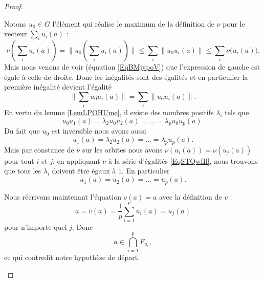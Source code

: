 \begin{proof}
\begin{subproof}
        Notons \( u_0\in G\) l'élément qui réalise le maximum de la définition de \( \nu\) pour le vecteur \( \sum_iu_i(a)\) :
        \begin{equation}
            \nu\left( \sum_i u_i(a) \right)=\| u_0\left( \sum_iu_i(a) \right) \|\leq\sum_i\| u_0u_i(a) \|\leq \sum_i\nu\big( u_i(a) \big).
        \end{equation}
        Mais nous venons de voir (équation \eqref{EqBMjypoV}) que l'expression de gauche est égale à celle de droite. Donc les inégalités sont des égalités et en particulier la première inégalité devient l'égalité
        \begin{equation}
            \| \sum_iu_0u_i(a)  \|=\sum_i\| u_0u_i(a) \|.
        \end{equation}
        En vertu du lemme \ref{LemLPOHUme}, il existe des nombres positifs \( \lambda_i\) tels que
        \begin{equation}
            u_0u_1(a)=\lambda_2u_0u_2(a)=\ldots =\lambda_pu_0u_p(a).
        \end{equation}
        Du fait que \( u_0\) est inversible nous avons aussi 
        \begin{equation}       \label{EqSTQwfIl}
            u_1(a)=\lambda_2u_2(a)=\ldots =\lambda_pu_p(a).
        \end{equation}
        Mais par constance de \( \nu\) sur les orbites nous avons \( \nu(u_i(a))=\nu(u_j(a))\) pour tout \( i\) et \( j\); en appliquant \( \nu\) à la série d'égalités \eqref{EqSTQwfIl}, nous trouvons que tous les \( \lambda_i\) doivent être égaux à \( 1\). En particulier
        \begin{equation}     
            u_1(a)=u_2(a)=\ldots =u_p(a).
        \end{equation}
        
        Nous récrivons maintenant l'équation \( v(a)=a\) avec la définition de \( v\) :
        \begin{equation}
            a=v(a)=\frac{1}{ p }\sum_{i=1}^pu_i(a)=u_j(a)
        \end{equation}
        pour n'importe quel \( j\). Donc
        \begin{equation}
            a\in\bigcap_{i=1}^pF_{u_i},
        \end{equation}
        ce qui contredit notre hypothèse de départ.
            
        \end{subproof}

\end{proof}


